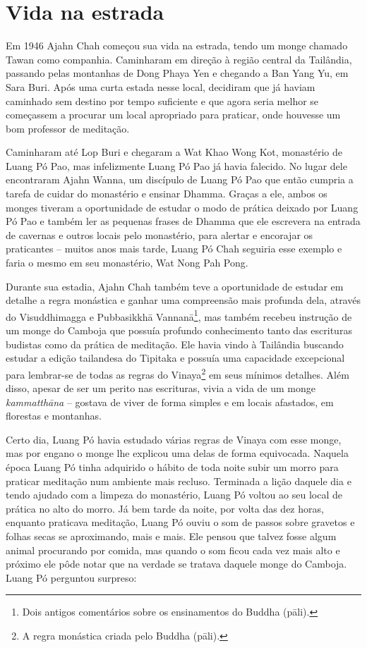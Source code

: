 \chapter{Vida na estrada}

Em 1946 Ajahn Chah começou sua vida na estrada, tendo um monge chamado
Tawan como companhia. Caminharam em direção à região central da
Tailândia, passando pelas montanhas de Dong Phaya Yen e chegando a Ban
Yang Yu, em Sara Buri. Após uma curta estada nesse local, decidiram que
já haviam caminhado sem destino por tempo suficiente e que agora seria
melhor se começassem a procurar um local apropriado para praticar, onde
houvesse um bom professor de meditação.

Caminharam até Lop Buri e chegaram a Wat Khao Wong Kot, monastério de
Luang Pó Pao, mas infelizmente Luang Pó Pao já havia falecido. No lugar
dele encontraram Ajahn Wanna, um discípulo de Luang Pó Pao que então
cumpria a tarefa de cuidar do monastério e ensinar Dhamma. Graças a ele,
ambos os monges tiveram a oportunidade de estudar o modo de prática
deixado por Luang Pó Pao e também ler as pequenas frases de Dhamma que
ele escrevera na entrada de cavernas e outros locais pelo monastério,
para alertar e encorajar os praticantes -- muitos anos mais tarde, Luang
Pó Chah seguiria esse exemplo e faria o mesmo em seu monastério, Wat
Nong Pah Pong.

Durante sua estadia, Ajahn Chah também teve a oportunidade de estudar em
detalhe a regra monástica e ganhar uma compreensão mais profunda dela,
através do Visuddhimagga e Pubbasikkhā Vannanā\footnote{Dois antigos
  comentários sobre os ensinamentos do Buddha (pāli).}, mas também
recebeu instrução de um monge do Camboja que possuía profundo
conhecimento tanto das escrituras budistas como da prática de meditação.
Ele havia vindo à Tailândia buscando estudar a edição tailandesa do
Tipitaka e possuía uma capacidade excepcional para lembrar-se de todas
as regras do Vinaya\footnote{A regra monástica criada pelo Buddha
  (pāli).} em seus mínimos detalhes. Além disso, apesar de ser um perito
nas escrituras, vivia a vida de um monge \emph{kammatthāna} -- gostava
de viver de forma simples e em locais afastados, em florestas e
montanhas.

Certo dia, Luang Pó havia estudado várias regras de Vinaya com esse
monge, mas por engano o monge lhe explicou uma delas de forma
equivocada. Naquela época Luang Pó tinha adquirido o hábito de toda
noite subir um morro para praticar meditação num ambiente mais recluso.
Terminada a lição daquele dia e tendo ajudado com a limpeza do
monastério, Luang Pó voltou ao seu local de prática no alto do morro. Já
bem tarde da noite, por volta das dez horas, enquanto praticava
meditação, Luang Pó ouviu o som de passos sobre gravetos e folhas secas
se aproximando, mais e mais. Ele pensou que talvez fosse algum animal
procurando por comida, mas quando o som ficou cada vez mais alto e
próximo ele pôde notar que na verdade se tratava daquele monge do
Camboja. Luang Pó perguntou surpreso:

